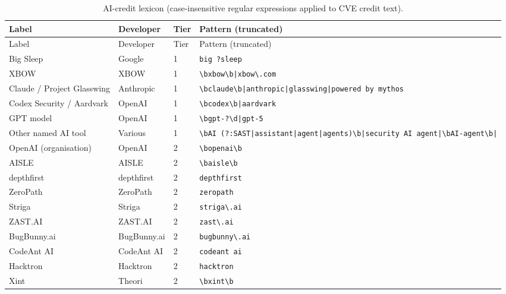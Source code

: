 \begin{longtable}{p{}p{}p{}p{}}
\caption{AI-credit lexicon (case-insensitive regular expressions applied to CVE credit text).}\label{tab:lexicon}\\
\toprule
Label & Developer & Tier & Pattern (truncated) \\
\midrule
\endfirsthead
\toprule
Label & Developer & Tier & Pattern (truncated) \\
\midrule
\endhead
\bottomrule
\endfoot
Big Sleep & Google & 1 & \texttt{big ?sleep} \\
XBOW & XBOW & 1 & \texttt{\textbackslash{}bxbow\textbackslash{}b|\allowbreak{}xbow\textbackslash{}.com} \\
Claude / Project Glasswing & Anthropic & 1 & \texttt{\textbackslash{}bclaude\textbackslash{}b|\allowbreak{}anthropic|\allowbreak{}glasswing|\allowbreak{}powered by mythos} \\
Codex Security / Aardvark & OpenAI & 1 & \texttt{\textbackslash{}bcodex\textbackslash{}b|\allowbreak{}aardvark} \\
GPT model & OpenAI & 1 & \texttt{\textbackslash{}bgpt-?\textbackslash{}d|\allowbreak{}gpt-5} \\
Other named AI tool & Various & 1 & \texttt{\textbackslash{}bAI (?:SAST|\allowbreak{}assistant|\allowbreak{}agent|\allowbreak{}agents)\textbackslash{}b|\allowbreak{}security AI agent|\allowbreak{}\textbackslash{}bAI-agent\textbackslash{}b|\allowbreak{}} \\
OpenAI (organisation) & OpenAI & 2 & \texttt{\textbackslash{}bopenai\textbackslash{}b} \\
AISLE & AISLE & 2 & \texttt{\textbackslash{}baisle\textbackslash{}b} \\
depthfirst & depthfirst & 2 & \texttt{depthfirst} \\
ZeroPath & ZeroPath & 2 & \texttt{zeropath} \\
Striga & Striga & 2 & \texttt{striga\textbackslash{}.ai} \\
ZAST.AI & ZAST.AI & 2 & \texttt{zast\textbackslash{}.ai} \\
BugBunny.ai & BugBunny.ai & 2 & \texttt{bugbunny\textbackslash{}.ai} \\
CodeAnt AI & CodeAnt AI & 2 & \texttt{codeant ai} \\
Hacktron & Hacktron & 2 & \texttt{hacktron} \\
Xint & Theori & 2 & \texttt{\textbackslash{}bxint\textbackslash{}b} \\

\end{longtable}
